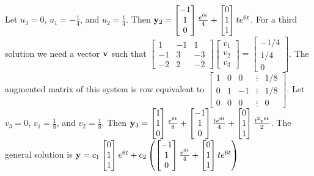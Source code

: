 \documentclass{ximera}
\begin{document}
\begin{problem}
\begin{solution}
Let $u_3=0$, $u_1=-\frac{1 }{4}$, and $u_2=\frac{1 }{4}$. Then ${\bf
y}_2=  \begin{bmatrix}-1\\1\\0 \end{bmatrix}\frac{e^{6t} }{4}+  \begin{bmatrix}0\\1\\1 \end{bmatrix}te^{6t}$.
For a third solution we need a vector ${\bf v}$ such that
$  \begin{bmatrix}1&-1&1\\-1&3&-3\\-2&2&-2 \end{bmatrix} \begin{bmatrix}v_1\\v_2\\v_3 \end{bmatrix}
=  \begin{bmatrix}-1/4\\1/4\\0 \end{bmatrix}$.
The augmented matrix of this system is row equivalent to
$  \begin{bmatrix}1&0&0&\vdots&1/8\\0&1&-1&
\vdots&1/8\\0&0&0&\vdots&0 \end{bmatrix}$.
Let $v_3=0$, $v_1= \frac{1 }{8}$, and $v_2= \frac{1 }{8}$. Then
${\bf y}_3=   \begin{bmatrix}1\\1\\0 \end{bmatrix}\frac{e^{6t} }{8}+
  \begin{bmatrix}-1\\1\\0 \end{bmatrix}\frac{te^{6t} }{4}+  \begin{bmatrix}0\\1\\1 \end{bmatrix}\frac{t^2e^{6t} }{2}$.
The general solution is
${\bf y}= c_1 \begin{bmatrix}0\\1\\1 \end{bmatrix}e^{6t}+
c_2\left( \begin{bmatrix}-1\\1\\0 \end{bmatrix}\frac{e^{6t} }{4}+ \begin{bmatrix}0\\1\\1 \end{bmatrix}te^{6t}\right)$

\end{solution}
\end{problem}
\end{document}
